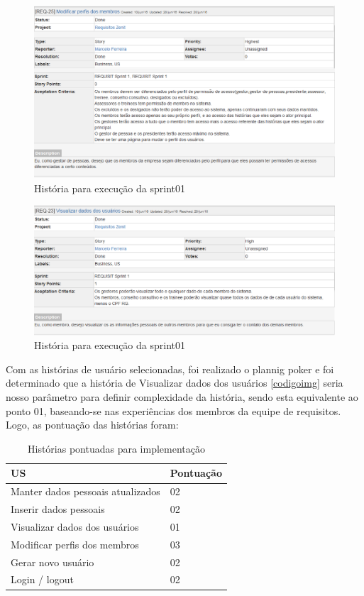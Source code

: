 \begin{figure}[H]
    \centering
    \includegraphics[keepaspectratio=true,scale=0.6]{figuras/us06.eps}
    \caption[História da sprint 01]{História para execução da sprint01}
\end{figure}
\begin{figure}[H]
    \centering
    \includegraphics[keepaspectratio=true,scale=0.6]{figuras/us07.eps}
    \caption[História da sprint 01]{História para execução da sprint01}
\end{figure}

Com as histórias de usuário selecionadas, foi realizado o plannig poker e foi determinado que a história de Visualizar dados dos usuários \ref{codigoimg} seria nosso parâmetro para definir complexidade da história, sendo esta equivalente ao ponto 01, baseando-se nas experiências dos membros da equipe de requisitos. Logo, as pontuação das histórias foram: 

\begin{table}[H]
    \centering
    \label{historiasImplementar}
    \caption{Histórias pontuadas para implementação}
    \begin{tabular}{|l|l|}
        \hline
        US & Pontuação\\
        \hline
        Manter dados pessoais atualizados & 02\\
        \hline
        Inserir dados pessoais &  02\\
        \hline
        Visualizar dados dos usuários & 01\\
        \hline
        Modificar perfis dos membros & 03\\
        \hline
        Gerar novo usuário & 02\\
        \hline 
        Login / logout & 02\\
        \hline
    \end{tabular}
\end{table}

